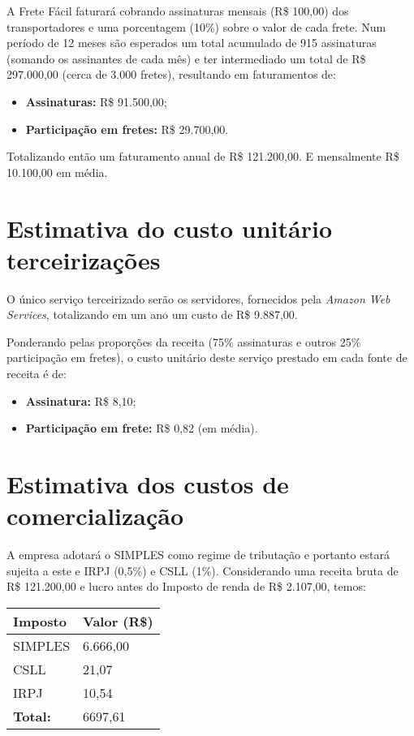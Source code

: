 A Frete Fácil faturará cobrando assinaturas mensais (R\$ 100,00) dos transportadores e uma porcentagem (10\%) sobre o valor de cada frete. Num período de 12 meses são esperados um total acumulado de 915 assinaturas (somando os assinantes de cada mês) e ter intermediado um total de R\$ 297.000,00 (cerca de 3.000 fretes), resultando em faturamentos de:

\begin{itemize}
  \item \textbf{Assinaturas:} R\$ 91.500,00;
  \item \textbf{Participação em fretes:} R\$ 29.700,00.
\end{itemize}

Totalizando então um faturamento anual de R\$ 121.200,00. E mensalmente R\$ 10.100,00 em média.

\section{Estimativa do custo unitário terceirizações}\label{sec:custounitario}

O único serviço terceirizado serão os servidores, fornecidos pela \textit{Amazon Web Services}, totalizando em um ano um custo de R\$ 9.887,00.

Ponderando pelas proporções da receita (75\% assinaturas e outros 25\% participação em fretes), o custo unitário deste serviço prestado em cada fonte de receita é de:

\begin{itemize}
  \item \textbf{Assinatura:} R\$ 8,10;
  \item \textbf{Participação em frete:} R\$ 0,82 (em média).
\end{itemize}

\section{Estimativa dos custos de comercialização}\label{sec:custosdecomercializacao}
A empresa adotará o SIMPLES como regime de tributação e portanto estará sujeita a este e IRPJ (0,5\%) e CSLL (1\%). Considerando uma receita bruta de R\$ 121.200,00 e lucro antes do Imposto de renda de R\$ 2.107,00, temos:
\newline \newline
\begin{tabular}{| l | l |}
  \hline
  \textbf{Imposto} & \textbf{Valor (R\$)}\\ \hline
  SIMPLES & 6.666,00 \\ \hline
  CSLL & 21,07 \\ \hline
  IRPJ & 10,54 \\ \hline
  \textbf{Total:} & 6697,61 \\ \hline
\end{tabular}

